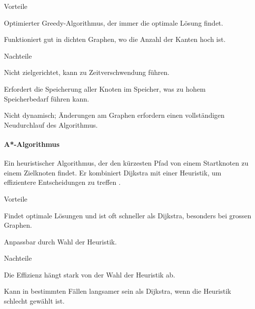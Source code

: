 \documentclass[../main.tex]{subfiles}
\begin{document}
\begin{minipage}[t]{0.48\textwidth}
\begin{items}
  \item [Vorteile]
  \item Optimierter Greedy-Algorithmus, der immer die optimale Lösung findet.
  \item Funktioniert gut in dichten Graphen, wo die Anzahl der Kanten hoch ist.
\end{items}
\end{minipage}
\hfill
\begin{minipage}[t]{0.48\textwidth}
\begin{items}
  \item [Nachteile]
  \item Nicht zielgerichtet, kann zu Zeitverschwendung führen.
  \item Erfordert die Speicherung aller Knoten im Speicher, was zu hohem Speicherbedarf führen kann.
  \item Nicht dynamisch; Änderungen am Graphen erfordern einen vollständigen Neudurchlauf des Algorithmus.
\end{items}
\end{minipage}
\paragraph{A*-Algorithmus}

Ein heuristischer Algorithmus, der den kürzesten Pfad von einem Startknoten zu einem Zielknoten findet. Er kombiniert Dijkstra mit einer Heuristik, um effizientere Entscheidungen zu treffen \cite{dijkstra_vs_astar}.

\begin{minipage}[t]{0.48\textwidth}
\begin{items}
  \item [Vorteile]
  \item Findet optimale Lösungen und ist oft schneller als Dijkstra, besonders bei grossen Graphen.
  \item Anpassbar durch Wahl der Heuristik.
\end{items}
\end{minipage}
\hfill
\begin{minipage}[t]{0.48\textwidth}
\begin{items}
  \item [Nachteile]
  \item Die Effizienz hängt stark von der Wahl der Heuristik ab.
  \item Kann in bestimmten Fällen langsamer sein als Dijkstra, wenn die Heuristik schlecht gewählt ist.
\end{items}
\end{minipage}
\end{document}
